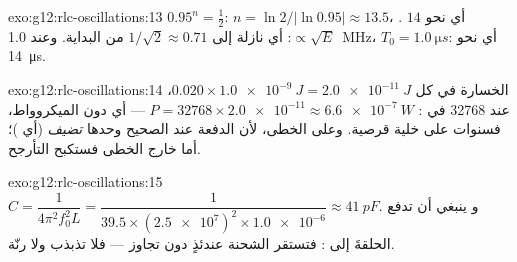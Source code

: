 \begin{solution}{exo:g12:rlc-oscillations:13}
$0.95^n = \tfrac12$: $n = \ln 2/\lvert\ln 0.95\rvert \approx 13.5$،
أي نحو $14$ .  $\propto \sqrt{E}$: أي نازلة إلى
$1/\sqrt{2} \approx 0.71$ من البداية. وعند \qty{1.0}{MHz}،
$T_0 = \qty{1.0}{\micro s}$: أي نحو \qty{14}{\micro s}.
\end{solution}

\begin{solution}{exo:g12:rlc-oscillations:14}
الخسارة في كل  $0.020 \times \qty{1.0e-9}{J} = \qty{2.0e-11}{J}$، عند
\num{32768}  في : $P = \num{32768} \times \num{2.0e-11}
\approx \qty{6.6e-7}{W}$ --- أي دون الميكروواط، فسنوات على خلية
قرصية. وعلى الخطى، لأن الدفعة عند  الصحيح وحدها \emph{تضيف}
 (أي )؛ أما خارج الخطى فستكبح التأرجح.
\end{solution}

\begin{solution}{exo:g12:rlc-oscillations:15}
$C = \dfrac{1}{4\pi^2 f_0^2 L} = \dfrac{1}{39.5 \times
(\num{2.5e7})^2 \times \num{1.0e-6}} \approx \qty{41}{pF}$. و
ينبغي أن تدفع  الحلقةَ إلى : فتستقر الشحنة
عندئذٍ دون تجاوز --- فلا تذبذب ولا رنّة.
\end{solution}

